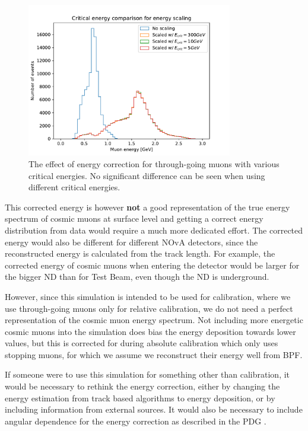 \begin{figure}[hbtp]
\centering
\includegraphics[width=0.8\textwidth]{Plots/TBCalibration/DBSim_ECritComparison.pdf}
\caption[Energy correction for through-going muons for the data-based simulation]{The effect of energy correction for through-going muons with various critical energies. No significant difference can be seen when using different critical energies.}
\label{fig:DataBasedSimEnergyScaling}
\end{figure}

This corrected energy is however \textbf{not} a good representation of the true energy spectrum of cosmic muons at surface level and getting a correct energy distribution from data would require a much more dedicated effort. The corrected energy would also be different for different \gls{NOvA} detectors, since the reconstructed energy is calculated from the track length. For example, the corrected energy of cosmic muons when entering the detector would be larger for the bigger \gls{ND} than for Test Beam, even though the \gls{ND} is underground. 

However, since this simulation is intended to be used for calibration, where we use through-going muons only for relative calibration, we do not need a perfect representation of the cosmic muon energy spectrum. Not including more energetic cosmic muons into the simulation does bias the energy deposition towards lower values, but this is corrected for during absolute calibration which only uses stopping muons, for which we assume we reconstruct their energy well from \gls{BPF}.

If someone were to use this simulation for something other than calibration, it would be necessary to rethink the energy correction, either by changing the energy estimation from track based algorithms to energy deposition, or by including information from external sources. It would also be necessary to include angular dependence for the energy correction as described in the PDG \cite{PDG.pdf}.

